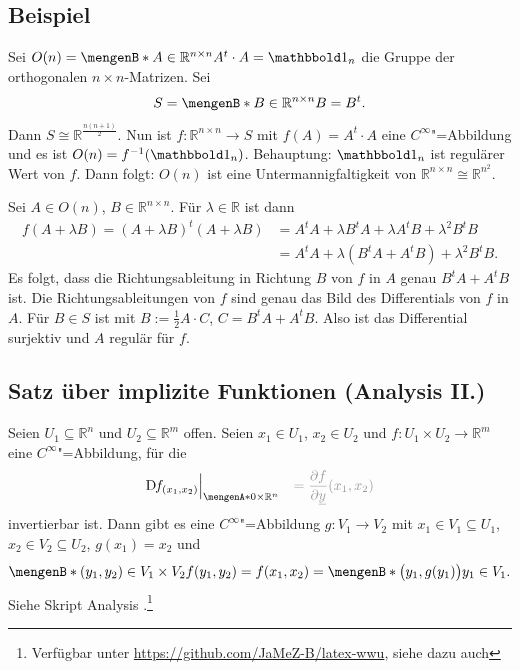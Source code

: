 \subsection[Beispielanwendung von \ref{sub:167} für die orthogonalen Matrizen]{Beispiel} %
\label{sub:168}
Sei $O(n) = \set[A \in \mathds{R}^{n \times n}]{ A^t \cdot A= \ind_n}$ die Gruppe der orthogonalen $n \times n$-Matrizen. Sei 
\[
	S = \set[B \in \mathds{R}^{n \times n}]{B = B^t}. 
\]
Dann $S \cong \mathds{R}^{\frac{n(n+1)}{2}}$. Nun ist $f : \mathds{R}^{n \times n} \to S$ mit $f(A)= A^t \cdot A$ eine 
$C^\infty$"=Abbildung und es ist $O(n) = f ^{-1}(\ind_n)$. 
Behauptung: $\ind_n$ ist regulärer Wert von $f$. Dann folgt: $O(n)$ ist eine Untermannigfaltigkeit von $\mathds{R}^{n \times n} \cong \mathds{R}^{n^2}$.

Sei $A \in O(n)$, $B \in \mathds{R}^{n \times n}$. Für $\lambda  \in \mathds{R}$ ist dann 
\begin{align*}
	f(A+ \lambda B) = (A+ \lambda B)^t (A+ \lambda B) &= A^t A + \lambda B^t A + \lambda A^t B + \lambda^2 B^t B \\ &= A^t A + \lambda (B^t A + A^t B) + \lambda^2 B^t B.
\end{align*}
Es folgt, dass die Richtungsableitung in Richtung $B$ von $f$ in $A$ genau $B^t A + A^t B$ ist. Die Richtungsableitungen von $f$ sind genau das Bild des Differentials von $f$
in $A$. Für $B \in S$ ist mit $B := \frac{1}{2} A \cdot C $, $C = B^t A + A^t B$. Also ist das Differential surjektiv und $A$ regulär für $f$. \bewende

\subsection{Satz über implizite Funktionen (Analysis II.)} %
\label{sub:169}
Seien $U_1 \subseteq \mathds{R}^n$ und $U_2 \subseteq \mathds{R}^m$ offen. Seien $x_1 \in U_1$, $x_2 \in U_2$ und $f : U_1 \times U_2 \to \mathds{R}^m$ eine 
$C^\infty$"=Abbildung, für die
\[
	\D f_{(x_1,x_2)} \Big|_{\set{0} \times \mathds{R}^n } \quad {\color{light_gray} = \diff{f}{\underline{y}} (x_1, x_2)}
\]
invertierbar ist. Dann gibt es eine $C^\infty$"=Abbildung $g : V_1 \to V_2$ mit $x_1 \in V_1 \subseteq U_1$, $x_2 \in V_2 \subseteq U_2$, $g(x_1)=x_2$ und 
\[
	\set[(y_1, y_2) \in V_1 \times V_2]{f(y_1, y_2)= f(x_1,x_2)\rule{0cm}{1em}} = \set[{\enbrace[\big]{y_1, g(y_1)}}]{y_1 \in V_1 \rule{0cm}{1em}}.  
\]
Siehe Skript  Analysis .\footnote{\label{note5}Verfügbar unter \url{https://github.com/JaMeZ-B/latex-wwu}, siehe dazu auch 
} \bewende


